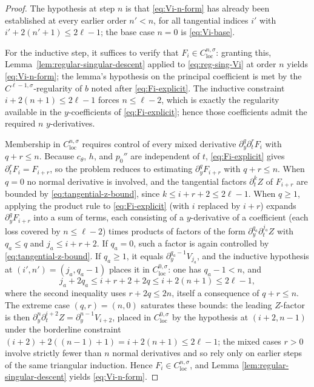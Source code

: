 \documentclass[10pt,a4paper]{amsart}
\newcommand{\loc}{\mathrm{loc}}
\begin{document}
\begin{proof}
The hypothesis at step \(n\) is that \eqref{eq:Vi-n-form} has already
been established at every earlier order \(n'<n\), for all tangential
indices \(i'\) with \(i'+2(n'+1)\le2\ell-1\); the base case \(n=0\) is
\eqref{eq:Vi-base}.

For the inductive step, it suffices to verify that
\(F_i\in C^{n,\sigma}_{\loc}\): granting this,
Lemma~\ref{lem:regular-singular-descent} applied to
\eqref{eq:reg-sing-Vi} at order \(n\) yields \eqref{eq:Vi-n-form}; the
lemma's hypothesis on the principal coefficient is met by the
\(C^{\ell-1,\sigma}\)-regularity of \(b\) noted after
\eqref{eq:Fi-explicit}. The inductive constraint
\(i+2(n+1)\le2\ell-1\) forces \(n\le\ell-2\), which is exactly the
regularity available in the \(y\)-coefficients of
\eqref{eq:Fi-explicit}; hence those coefficients admit the required
\(n\) \(y\)-derivatives.

Membership in \(C^{n,\sigma}_{\loc}\) requires control of every mixed
derivative \(\partial_y^q\partial_t^rF_i\) with \(q+r\le n\). Because
\(c_\theta\), \(h\), and \(p_0''\) are independent of \(t\),
\eqref{eq:Fi-explicit} gives \(\partial_t^rF_i=F_{i+r}\), so the
problem reduces to estimating \(\partial_y^qF_{i+r}\) with
\(q+r\le n\). When \(q=0\) no normal derivative is involved, and the
tangential factors \(\partial_t^kZ\) of \(F_{i+r}\) are bounded by
\eqref{eq:tangential-z-bound}, since \(k\le i+r+2\le2\ell-1\). When
\(q\ge1\), applying the product rule to \eqref{eq:Fi-explicit} (with
\(i\) replaced by \(i+r\)) expands \(\partial_y^qF_{i+r}\) into a sum
of terms, each consisting of a \(y\)-derivative of a coefficient (each
loss covered by \(n\le\ell-2\)) times products of factors of the form
\(\partial_y^{q_a}\partial_t^{j_a}Z\) with \(q_a\le q\) and
\(j_a\le i+r+2\). If \(q_a=0\), such a factor is again controlled by
\eqref{eq:tangential-z-bound}. If \(q_a\ge1\), it equals
\(\partial_y^{q_a-1}V_{j_a}\), and the inductive hypothesis at
\((i',n')=(j_a,q_a-1)\) places it in \(C^{0,\sigma}_{\loc}\): one has
\(q_a-1<n\), and
\[
        j_a+2q_a\le i+r+2+2q\le i+2(n+1)\le2\ell-1,
\]
where the second inequality uses \(r+2q\le2n\), itself a consequence
of \(q+r\le n\). The extreme case \((q,r)=(n,0)\) saturates these
bounds: the leading \(Z\)-factor is then
\(\partial_y^n\partial_t^{i+2}Z=\partial_y^{n-1}V_{i+2}\), placed in
\(C^{0,\sigma}_{\loc}\) by the hypothesis at \((i+2,n-1)\) under the
borderline constraint \((i+2)+2((n-1)+1)=i+2(n+1)\le2\ell-1\); the
mixed cases \(r>0\) involve strictly fewer than \(n\) normal
derivatives and so rely only on earlier steps of the same triangular
induction. Hence \(F_i\in C^{n,\sigma}_{\loc}\), and Lemma
\ref{lem:regular-singular-descent} yields \eqref{eq:Vi-n-form}.


\end{proof}
\end{document}
